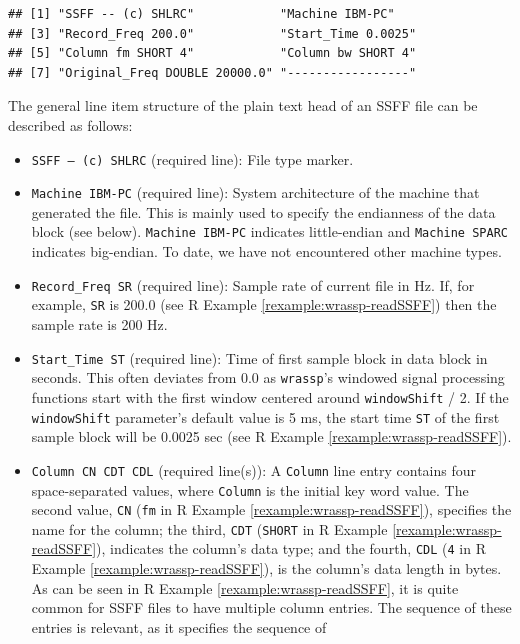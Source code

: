 \documentclass[]{book}
\theoremstyle{definition}
\theoremstyle{definition}
\theoremstyle{definition}
\theoremstyle{remark}
\begin{document}
\begin{verbatim}
## [1] "SSFF -- (c) SHLRC"            "Machine IBM-PC"              
## [3] "Record_Freq 200.0"            "Start_Time 0.0025"           
## [5] "Column fm SHORT 4"            "Column bw SHORT 4"           
## [7] "Original_Freq DOUBLE 20000.0" "-----------------"
\end{verbatim}

The general line item structure of the plain text head of an SSFF file
can be described as follows:

\begin{itemize}
\item
  \texttt{SSFF\ –\ (c)\ SHLRC} (required line): File type marker.
\item
  \texttt{Machine\ IBM-PC} (required line): System architecture of the
  machine that generated the file. This is mainly used to specify the
  endianness of the data block (see below). \texttt{Machine\ IBM-PC}
  indicates little-endian and \texttt{Machine\ SPARC} indicates
  big-endian. To date, we have not encountered other machine types.
\item
  \texttt{Record\_Freq\ SR} (required line): Sample rate of current file
  in Hz. If, for example, \texttt{SR} is 200.0 (see R Example
  \ref{rexample:wrassp-readSSFF}) then the sample rate is 200 Hz.
\item
  \texttt{Start\_Time\ ST} (required line): Time of first sample block
  in data block in seconds. This often deviates from 0.0 as
  \texttt{wrassp}'s windowed signal processing functions start with the
  first window centered around \texttt{windowShift} / 2. If the
  \texttt{windowShift} parameter's default value is 5 ms, the start time
  \texttt{ST} of the first sample block will be 0.0025 sec (see R
  Example \ref{rexample:wrassp-readSSFF}).
\item
  \texttt{Column\ CN\ CDT\ CDL} (required line(s)): A \texttt{Column}
  line entry contains four space-separated values, where \texttt{Column}
  is the initial key word value. The second value, \texttt{CN}
  (\texttt{fm} in R Example \ref{rexample:wrassp-readSSFF}), specifies
  the name for the column; the third, \texttt{CDT} (\texttt{SHORT} in R
  Example \ref{rexample:wrassp-readSSFF}), indicates the column's data
  type; and the fourth, \texttt{CDL} (\texttt{4} in R Example
  \ref{rexample:wrassp-readSSFF}), is the column's data length in bytes.
  As can be seen in R Example \ref{rexample:wrassp-readSSFF}, it is
  quite common for SSFF files to have multiple column entries. The
  sequence of these entries is relevant, as it specifies the sequence of

\end{itemize}
\end{document}
